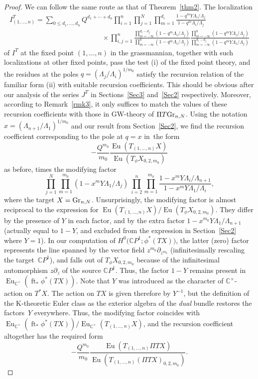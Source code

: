 \documentclass[pdftex]{sigma}
\numberwithin{equation}{section}
\def\CC{\mathbb C}
\def\p{\partial}
\def\ft{\operatorname{ft}}
\def\Eu{\operatorname{Eu}}
\begin{document}
\begin{proof}
We can follow the same route as that of Theorem~\ref{thm2}. The localization
\begin{gather*}
I^T_{(1,\dots,n)}= \sum_{0\leq d_1,\dots,d_n}Q^{d_1+\cdots+d_n} \prod_{i=1}^n\prod_{j=1}^N\prod_{m=1}^{d_i}\frac{1-q^mY\Lambda_i/\Lambda_j} {1-q^m\Lambda_i/\Lambda_j} \\ \phantom{I^T_{(1,\dots,n)}= \sum_{0\leq d_1,\dots,d_n}Q^{d_1+\cdots}}
{}\times \prod_{i,j=1}^n\frac{\prod_{m=-\infty}^{d_i-d_j}(1-q^m\Lambda_i/\Lambda_j)} {\prod_{m=-\infty}^0(1-q^m\Lambda_i/\Lambda_j)}\frac{\prod_{m=-\infty}^0(1-q^mY \Lambda_i/\Lambda_j)} {\prod_{m=-\infty}^{d_i-d_j}(1-q^mY \Lambda_i/\Lambda_j)}
\end{gather*}
of $I^T$ at the fixed point $(1,\dots,n)$ in the grassmannian, together with such localizations at other fixed points, pass the test (i) of the fixed point theory, and the residues at the poles $q=(\Lambda_j/\Lambda_i)^{1/m_0}$ satisfy the recursion relation of the familiar form (ii) with suitable recursion coefficients. This should be obvious after our analysis of the series $J^T$ in Sections~\ref{Sec3} and~\ref{Sec2} respectively. Moreover, according to Remark~\ref{rmk3}, it only suffices to match the values of these recursion coefficients with those in GW-theory of $\Pi T {\rm Gr}_{n,N}$. Using the notation $x=(\Lambda_{n+1}/\Lambda_1)^{1/m_0}$ and our result from Section~\ref{Sec2}, we find the recursion coefficient corresponding to the pole at $q=x$ in~the form
\[
-\frac{Q^{m_0}}{m_0} \frac{\Eu(T_{(1,\dots,n)}X)}{\Eu(T_{\phi}X_{0,2,m_0})}
\]
as before, times the modifying factor
\[
\prod_{j=1}^N\prod_{m=1}^{m_0}(1-x^mY\Lambda_1/\Lambda_j)\ \prod_{i=2}^n\prod_{m=1}^{m_0} \frac{1-x^mY\Lambda_i/\Lambda_{n+1}}{1-x^mY\Lambda_1/\Lambda_i},
\]
where the target $X={\rm Gr}_{n,N}$. Unsurprisingly, the modifying factor is almost reciprocal to the expression for $\Eu(T_{(1,\dots,n)}X)/\Eu(T_{\phi}X_{0,2,m_0})$. They differ by the presence of $Y$ in each factor, and by the extra factor $1-x^{m_0}Y\Lambda_1/\Lambda_{n+1}$ (actually equal to $1-Y$, and excluded from the expression in Section~\ref{Sec2} where $Y=1$). In our computation of $H^0\big(\CC P^1;\phi^*(TX)\big)$, the latter (zero) factor represents the line spanned by the vector field $z^{m_0}\p_{z^{m_0}}$ (infinitesimally rescaling the target~$\CC P^1$), and falls out of $T_{\phi}X_{0,2,m_0}$ because of the infinitesimal automorphism $z\p_z$ of the source $\CC P^1$. Thus, the factor $1-Y$ remains present in $\Eu_{\CC^{\times}}(\ft_*\phi^*(TX))$. Note that $Y$ was introduced as the character of $\CC^{\times}$-action on $T^*X$. The action on $TX$ is given therefore by $Y^{-1}$, but the definition of the K-theoretic Euler class as the exterior algebra of the {\em dual} bundle restores the factors~$Y$ everywhere. Thus, the modifying factor coincides with $\Eu_{\CC^{\times}}(\ft_*\phi^*(TX))/\Eu_{\CC^{\times}}(T_{(1,\dots,n)}X)$, and the recursion coefficient altogether has the required form
\[
-\frac{Q^{m_0}}{m_0} \frac{\Eu(T_{(1,\dots,n)}\Pi TX)}{\Eu (T_{(1,\dots,n)}(\Pi TX)_{0,2,m_0})}.\tag*{\qed}
\]
\renewcommand{\qed}{}
\end{proof}
\end{document}
